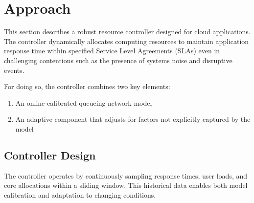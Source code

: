 
\newcommand{\funcstyle}[1]{\textcolor{purple!70!black}{\textbf{#1}}}

\section{Approach}
This section describes a robust resource controller designed for cloud applications. The controller dynamically allocates computing resources to maintain application response time within specified Service Level Agreements (SLAs) even in challenging contentions such as the presence of systems noise and disruptive events.

For doing so, the controller combines two key elements:

\begin{enumerate}
    \item An online-calibrated queueing network model
    \item An adaptive component that adjusts for factors not explicitly captured by the model
\end{enumerate}

\subsection{Controller Design}

The controller operates by continuously sampling response times, user loads, and core allocations within a sliding window. This historical data enables both model calibration and adaptation to changing conditions.

